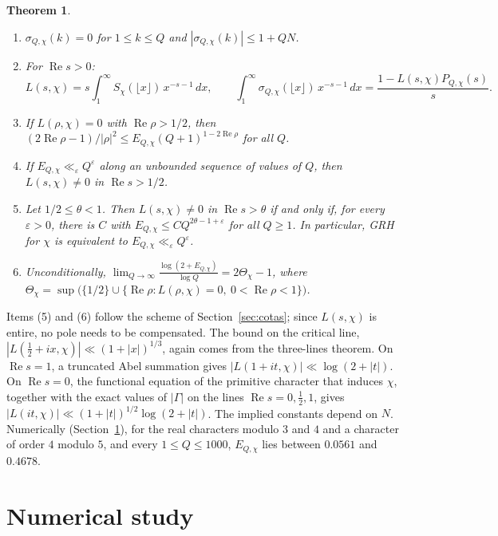 \documentclass[11pt,a4paper]{amsart}
\newtheorem{theorem}{Theorem}
\theoremstyle{definition}
\theoremstyle{remark}
\renewcommand{\Re}{\operatorname{Re}}
\begin{document}
\begin{theorem}\label{teo:dirichlet}
\begin{enumerate}
\item $\sigma_{Q,\chi}(k)=0$ for $1\le k\le Q$ and $|\sigma_{Q,\chi}(k)|\le1+QN$.
\item For $\Re s>0$:
\[
L(s,\chi)=s\int_1^\infty S_\chi(\lfloor x\rfloor)\,x^{-s-1}\,dx,\qquad
\int_1^\infty\sigma_{Q,\chi}(\lfloor x\rfloor)\,x^{-s-1}\,dx=\frac{1-L(s,\chi)P_{Q,\chi}(s)}{s}.
\]
\item If $L(\rho,\chi)=0$ with $\Re\rho>1/2$, then $(2\Re\rho-1)/|\rho|^2\le E_{Q,\chi}(Q+1)^{1-2\Re\rho}$ for all $Q$.
\item If $E_{Q,\chi}\ll_\varepsilon Q^\varepsilon$ along an unbounded sequence of values of $Q$, then $L(s,\chi)\ne0$ in $\Re s>1/2$.
\item Let $1/2\le\theta<1$. Then $L(s,\chi)\ne0$ in $\Re s>\theta$ if and only if, for every $\varepsilon>0$, there is $C$ with $E_{Q,\chi}\le CQ^{2\theta-1+\varepsilon}$ for all $Q\ge1$. In particular, GRH for $\chi$ is equivalent to $E_{Q,\chi}\ll_\varepsilon Q^\varepsilon$.
\item Unconditionally, $\displaystyle\lim_{Q\to\infty}\frac{\log(2+E_{Q,\chi})}{\log Q}=2\Theta_\chi-1$, where $\Theta_\chi=\sup\bigl(\{1/2\}\cup\{\Re\rho:L(\rho,\chi)=0,\ 0<\Re\rho<1\}\bigr)$.
\end{enumerate}
\end{theorem}

Items (5) and (6) follow the scheme of Section~\ref{sec:cotas}; since $L(s,\chi)$ is entire, no pole needs to be compensated. The bound on the critical line, $|L(\tfrac12+ix,\chi)|\ll(1+|x|)^{1/3}$, again comes from the three-lines theorem. On $\Re s=1$, a truncated Abel summation gives $|L(1+it,\chi)|\ll\log(2+|t|)$. On $\Re s=0$, the functional equation of the primitive character that induces $\chi$, together with the exact values of $|\Gamma|$ on the lines $\Re s=0,\tfrac12,1$, gives $|L(it,\chi)|\ll(1+|t|)^{1/2}\log(2+|t|)$. The implied constants depend on $N$. Numerically (Section~\ref{sec:numerica}), for the real characters modulo $3$ and $4$ and a character of order $4$ modulo $5$, and every $1\le Q\le1000$, $E_{Q,\chi}$ lies between $0.0561$ and $0.4678$.

\section{Numerical study}\label{sec:numerica}
\end{document}
